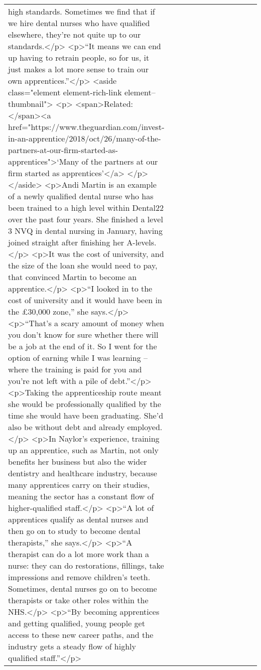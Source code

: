 \documentclass[]{article}
\begin{document}
\begin{table}[!h]
\begin{tabular}[t]{llllllllllll}
high standards. Sometimes we find that if we hire dental nurses who have qualified elsewhere, they’re not quite up to our standards.</p> <p>“It means we can end up having to retrain people, so for us, it just makes a lot more sense to train our own apprentices.”</p> <aside class="element element-rich-link element--thumbnail"> <p> <span>Related: </span><a href="https://www.theguardian.com/invest-in-an-apprentice/2018/oct/26/many-of-the-partners-at-our-firm-started-as-apprentices">‘Many of the partners at our firm started as apprentices’</a> </p> </aside>  <p>Andi Martin is an example of a newly qualified dental nurse who has been trained to a high level within Dental22 over the past four years. She finished a level 3 NVQ in dental nursing in January, having joined straight after finishing her A-levels.</p> <p>It was the cost of university, and the size of the loan she would need to pay, that convinced Martin to become an apprentice.</p> <p>“I looked in to the cost of university and it would have been in the £30,000 zone,” she says.</p> <p>“That’s a scary amount of money when you don’t know for sure whether there will be a job at the end of it. So I went for the option of earning while I was learning – where the training is paid for you and you’re not left with a pile of debt.”</p> <p>Taking the apprenticeship route meant she would be professionally qualified by the time she would have been graduating. She’d also be without debt and already employed.</p> <p>In Naylor’s experience, training up an apprentice, such as Martin, not only benefits her business but also the wider dentistry and healthcare industry, because many apprentices carry on their studies, meaning the sector has a constant flow of higher-qualified staff.</p> <p>“A lot of apprentices qualify as dental nurses and then go on to study to become dental therapists,” she says.</p> <p>“A therapist can do a lot more work than a nurse: they can do restorations, fillings, take impressions and remove children’s teeth. Sometimes, dental nurses go on to become therapists or take other roles within the NHS.</p> <p>“By becoming apprentices and getting qualified, young people get access to these new career paths, and the industry gets a steady flow of highly qualified staff.”</p>\\

\end{tabular}
\end{table}
\end{document}
